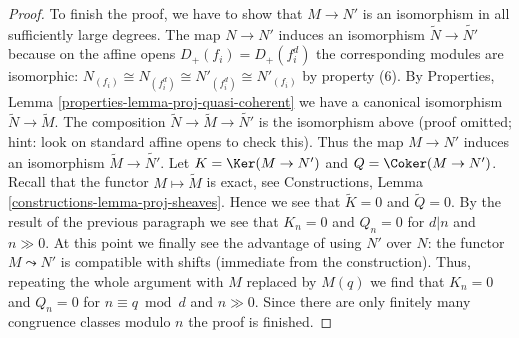 \begin{proof}
\medskip\noindent
To finish the proof, we have to show that $M \to N'$ is an isomorphism
in all sufficiently large degrees. The map $N \to N'$ induces an
isomorphism $\widetilde{N} \to \widetilde{N'}$ because on the affine
opens $D_+(f_i) = D_+(f_i^d)$ the corresponding modules are isomorphic:
$N_{(f_i)} \cong N_{(f_i^d)} \cong N'_{(f_i^d)} \cong N'_{(f_i)}$
by property (6).
By Properties, Lemma \ref{properties-lemma-proj-quasi-coherent}
we have a canonical isomorphism $\widetilde{N} \to \widetilde{M}$.
The composition $\widetilde{N} \to \widetilde{M} \to \widetilde{N'}$
is the isomorphism above (proof omitted; hint: look on standard
affine opens to check this). Thus the map $M \to N'$ induces an isomorphism
$\widetilde{M} \to \widetilde{N'}$.
Let $K = \Ker(M \to N')$ and $Q = \Coker(M \to N')$.
Recall that the functor
$M \mapsto \widetilde{M}$ is exact, see
Constructions, Lemma \ref{constructions-lemma-proj-sheaves}.
Hence we see that $\widetilde{K} = 0$ and $\widetilde{Q} = 0$.
By the result of the previous paragraph we see that $K_n = 0$ and
$Q_n = 0$ for $d | n$ and $n \gg 0$. At this point we finally see
the advantage of using $N'$ over $N$: the functor $M \leadsto N'$
is compatible with shifts (immediate from the construction).
Thus, repeating the whole argument with $M$ replaced by $M(q)$
we find that $K_n = 0$ and $Q_n = 0$ for $n \equiv q \bmod d$
and $n \gg 0$. Since there are
only finitely many congruence classes modulo $n$ the proof is finished.
\end{proof}
